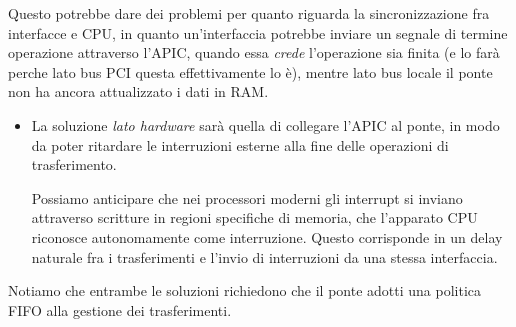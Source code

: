\documentclass[a4paper,11pt]{article}
\begin{document}
Questo potrebbe dare dei problemi per quanto riguarda la sincronizzazione fra interfacce e CPU, in quanto un'interfaccia potrebbe inviare un segnale di termine operazione attraverso l'APIC, quando essa \textit{crede} l'operazione sia finita (e lo farà perche lato bus PCI questa effettivamente lo è), mentre lato bus locale il ponte non ha ancora attualizzato i dati in RAM.
\begin{itemize}
	\item La soluzione \textit{lato hardware} sarà quella di collegare l'APIC al ponte, in modo da poter ritardare le interruzioni esterne alla fine delle operazioni di trasferimento.

		Possiamo anticipare che nei processori moderni gli interrupt si inviano attraverso scritture in regioni specifiche di memoria, che l'apparato CPU riconosce autonomamente come interruzione.
		Questo corrisponde in un delay naturale fra i trasferimenti e l'invio di interruzioni da una stessa interfaccia.

\end{itemize}

Notiamo che entrambe le soluzioni richiedono che il ponte adotti una politica FIFO alla gestione dei trasferimenti.
\end{document}
